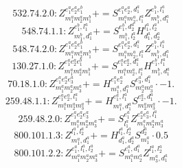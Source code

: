 \documentclass[letterpaper,10pt,fleqn,leqno,onecolumn]{article}
\begin{document}
\begin{equation} \;\;\;\;\;\;  532.74.2.0: Z^{e_{1}^{a}e_{2}^{a}e_{1}^{b}}_{m_{1}^{a}m_{2}^{a}m_{1}^{b}}+=S^{e_{1}^{a}e_{2}^{a},d_{1}^{a}}_{m_{1}^{a}m_{2}^{a},l_{1}^{a}}Z^{e_{1}^{b},l_{1}^{a}}_{m_{1}^{b},d_{1}^{a}} \end{equation}
\begin{equation} \;\;\;\;\;\;  548.74.1.1: Z^{e_{1}^{b},l_{1}^{a}}_{m_{1}^{b},d_{1}^{a}}+=S^{e_{1}^{b},d_{2}^{a}}_{m_{1}^{b},l_{2}^{a}}H^{l_{1}^{a},l_{2}^{a}}_{d_{1}^{a},d_{2}^{a}} \end{equation}
\begin{equation} \;\;\;\;\;\;  548.74.2.0: Z^{e_{1}^{a}e_{2}^{a}e_{1}^{b}}_{m_{1}^{a}m_{2}^{a}m_{1}^{b}}+=S^{e_{1}^{a}e_{2}^{a},d_{1}^{a}}_{m_{1}^{a}m_{2}^{a},l_{1}^{a}}Z^{e_{1}^{b},l_{1}^{a}}_{m_{1}^{b},d_{1}^{a}} \end{equation}
\begin{equation} \;\;\;\;\;\;  130.27.1.0: Z^{e_{1}^{a}e_{2}^{a}e_{1}^{b}}_{m_{1}^{a}m_{2}^{a}m_{1}^{b}}+=S^{e_{1}^{a}e_{2}^{a},d_{1}^{a}}_{m_{1}^{a}m_{2}^{a},l_{1}^{a}}H^{e_{1}^{b},l_{1}^{a}}_{m_{1}^{b},d_{1}^{a}} \end{equation}
\begin{equation} \;\;\;\;\;\;  70.18.1.0: Z^{e_{1}^{a}e_{2}^{a}e_{3}^{a}}_{m_{1}^{a}m_{2}^{a}m_{3}^{a}}+=H^{e_{1}^{a}e_{2}^{a}}_{m_{1}^{a},d_{1}^{a}}S^{e_{3}^{a},d_{1}^{a}}_{m_{2}^{a}m_{3}^{a}}\cdot -1. \end{equation}
\begin{equation} \;\;\;\;\;\;  259.48.1.1: Z^{e_{1}^{a}e_{2}^{a},l_{1}^{a}}_{m_{1}^{a}m_{2}^{a}m_{3}^{a}}+=H^{e_{1}^{a},l_{1}^{a}}_{m_{1}^{a},d_{1}^{a}}S^{e_{2}^{a},d_{1}^{a}}_{m_{2}^{a}m_{3}^{a}}\cdot -1. \end{equation}
\begin{equation} \;\;\;\;\;\;  259.48.2.0: Z^{e_{1}^{a}e_{2}^{a}e_{3}^{a}}_{m_{1}^{a}m_{2}^{a}m_{3}^{a}}+=S^{e_{1}^{a}}_{l_{1}^{a}}Z^{e_{2}^{a}e_{3}^{a},l_{1}^{a}}_{m_{1}^{a}m_{2}^{a}m_{3}^{a}} \end{equation}
\begin{equation} \;\;\;\;\;\;  800.101.1.3: Z^{l_{1}^{a},l_{2}^{a}}_{m_{1}^{a},d_{1}^{a}}+=H^{l_{1}^{a},l_{2}^{a}}_{d_{1}^{a},d_{2}^{a}}S^{d_{2}^{a}}_{m_{1}^{a}}\cdot 0.5 \end{equation}
\begin{equation} \;\;\;\;\;\;  800.101.2.2: Z^{e_{1}^{a},l_{1}^{a},l_{2}^{a}}_{m_{1}^{a}m_{2}^{a}m_{3}^{a}}+=S^{e_{1}^{a},d_{1}^{a}}_{m_{1}^{a}m_{2}^{a}}Z^{l_{1}^{a},l_{2}^{a}}_{m_{3}^{a},d_{1}^{a}} \end{equation}
\end{document}
